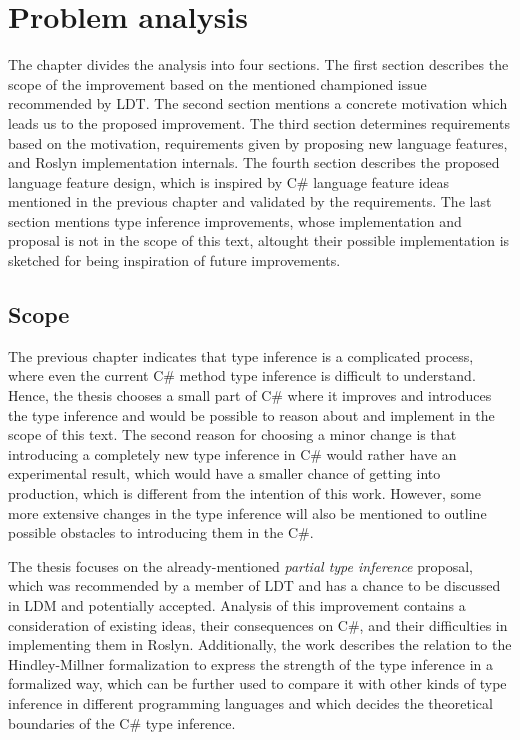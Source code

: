 \chapter{Problem analysis}
The chapter divides the analysis into four sections. 
The first section describes the scope of the improvement based on the mentioned championed issue recommended by \ac{LDT}. 
The second section mentions a concrete motivation which leads us to the proposed improvement. 
The third section determines requirements based on the motivation, requirements given by proposing new language features, and Roslyn implementation internals. 
The fourth section describes the proposed language feature design, which is inspired by C\# language feature ideas mentioned in the previous chapter and validated by the requirements.
The last section mentions type inference improvements, whose implementation and proposal is not in the scope of this text, altought their possible implementation is sketched for being inspiration of future improvements. 

\section{Scope}
The previous chapter indicates that type inference is a complicated process, where even the current C\# method type inference is difficult to understand. 
Hence, the thesis chooses a small part of C\# where it improves and introduces the type inference and would be possible to reason about and implement in the scope of this text. 
The second reason for choosing a minor change is that introducing a completely new type inference in C\# would rather have an experimental result, which would have a smaller chance of getting into production, which is different from the intention of this work. 
However, some more extensive changes in the type inference will also be mentioned to outline possible obstacles to introducing them in the C\#.
\par
{}
The thesis focuses on the already-mentioned \textit{partial type inference} proposal, which was recommended by a member of \ac{LDT} and has a chance to be discussed in \ac{LDM} and potentially accepted. 
Analysis of this improvement contains a consideration of existing ideas, their consequences on C\#, and their difficulties in implementing them in Roslyn. 
Additionally, the work describes the relation to the Hindley-Millner formalization to express the strength of the type inference in a formalized way, which can be further used to compare it with other kinds of type inference in different programming languages and which decides the theoretical boundaries of the C\# type inference.

